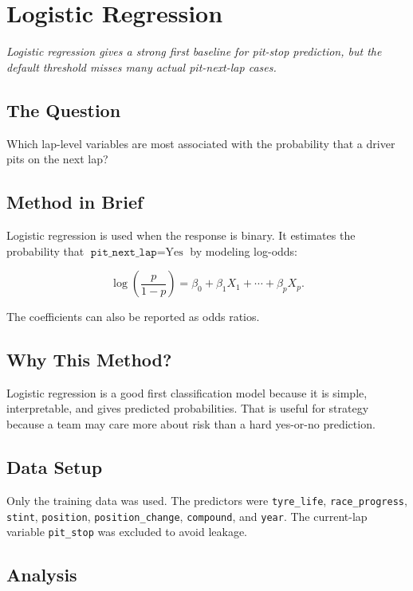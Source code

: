 \documentclass[11pt,oneside,openany]{book}
\newcommand{\chapterquote}[1]{%
\begin{center}
\small\textit{#1}
\end{center}
\vspace{-0.5em}
}
\begin{document}
\chapter{Logistic Regression}
\chapterquote{Logistic regression gives a strong first baseline for pit-stop prediction, but the default threshold misses many actual pit-next-lap cases.}

\section{The Question}

Which lap-level variables are most associated with the probability that a driver pits on the next lap?

\section{Method in Brief}

Logistic regression is used when the response is binary. It estimates the probability that \(\texttt{pit\_next\_lap}=\text{Yes}\) by modeling log-odds:

\[
\log\left(\frac{p}{1-p}\right)=\beta_0+\beta_1X_1+\cdots+\beta_pX_p.
\]

The coefficients can also be reported as odds ratios.

\section{Why This Method?}

Logistic regression is a good first classification model because it is simple, interpretable, and gives predicted probabilities. That is useful for strategy because a team may care more about risk than a hard yes-or-no prediction.

\section{Data Setup}

Only the training data was used. The predictors were \texttt{tyre\_life}, \texttt{race\_progress}, \texttt{stint}, \texttt{position}, \texttt{position\_change}, \texttt{compound}, and \texttt{year}. The current-lap variable \texttt{pit\_stop} was excluded to avoid leakage.

\section{Analysis}
\end{document}
